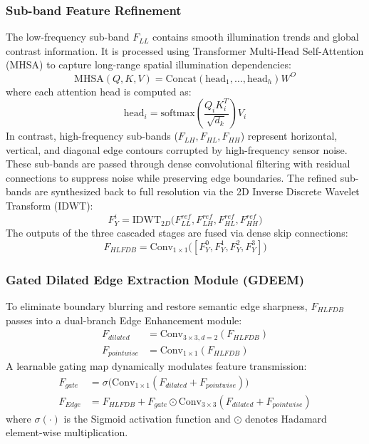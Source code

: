 \documentclass[10pt,twocolumn,letterpaper]{article}
\begin{document}
\subsubsection{Sub-band Feature Refinement}
The low-frequency sub-band $F_{LL}$ contains smooth illumination trends and global contrast information. It is processed using Transformer Multi-Head Self-Attention (MHSA) \cite{vaswani2017attention} to capture long-range spatial illumination dependencies:
\begin{equation}
\text{MHSA}(Q, K, V) = \text{Concat}(\text{head}_1, \dots, \text{head}_h)W^O
\end{equation}
where each attention head is computed as:
\begin{equation}
\text{head}_i = \text{softmax}\left(\frac{Q_i K_i^T}{\sqrt{d_k}}\right) V_i
\end{equation}
In contrast, high-frequency sub-bands ($F_{LH}, F_{HL}, F_{HH}$) represent horizontal, vertical, and diagonal edge contours corrupted by high-frequency sensor noise. These sub-bands are passed through dense convolutional filtering with residual connections to suppress noise while preserving edge boundaries. The refined sub-bands are synthesized back to full resolution via the 2D Inverse Discrete Wavelet Transform (IDWT):
\begin{equation}
F_Y^i = \text{IDWT}_{2D}\big( F_{LL}^{ref}, F_{LH}^{ref}, F_{HL}^{ref}, F_{HH}^{ref} \big)
\end{equation}
The outputs of the three cascaded stages are fused via dense skip connections:
\begin{equation}
F_{HLFDB} = \text{Conv}_{1\times1}\Big( [F_Y^0, F_Y^1, F_Y^2, F_Y^3] \Big)
\end{equation}

\subsubsection{Gated Dilated Edge Extraction Module (GDEEM)}
To eliminate boundary blurring and restore semantic edge sharpness, $F_{HLFDB}$ passes into a dual-branch Edge Enhancement module:
\begin{align}
F_{dilated} &= \text{Conv}_{3\times3, d=2}(F_{HLFDB}) \\
F_{pointwise} &= \text{Conv}_{1\times1}(F_{HLFDB})
\end{align}
A learnable gating map dynamically modulates feature transmission:
\begin{align}
F_{gate} &= \sigma\Big( \text{Conv}_{1\times1}(F_{dilated} + F_{pointwise}) \Big) \\
F_{Edge} &= F_{HLFDB} + F_{gate} \odot \text{Conv}_{3\times3}(F_{dilated} + F_{pointwise})
\end{align}
where $\sigma(\cdot)$ is the Sigmoid activation function and $\odot$ denotes Hadamard element-wise multiplication.
\end{document}
